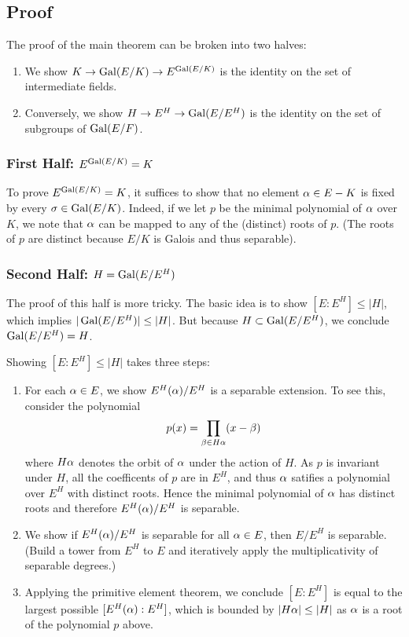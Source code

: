 \subsection{Proof}
The proof of the main theorem can be broken into two halves:
\begin{enumerate}
    \item We show $K \rightarrow \operatorname{Gal}(E/K) \rightarrow E^{\operatorname{Gal}(E/K)}$ is the identity on the set of intermediate fields.
    \item Conversely, we show $H \rightarrow E^H \rightarrow \operatorname{Gal}(E/E^H)$ is the identity on the set of subgroups of $\operatorname{Gal}(E/F)$.
\end{enumerate}

\subsubsection{First Half: $E^{\operatorname{Gal}(E/K)} = K$}
To prove $E^{\operatorname{Gal}(E/K)} = K$, it suffices to show that no element $\alpha \in E-K$ is fixed by every $\sigma \in \operatorname{Gal}(E/K)$. Indeed, if we let $p$ be the minimal polynomial of $\alpha$ over $K$, we note that $\alpha$ can be mapped to any of the (distinct) roots of $p$. (The roots of $p$ are distinct because $E/K$ is Galois and thus separable).

\subsubsection{Second Half: $H = \operatorname{Gal}(E/E^H)$}
The proof of this half is more tricky. The basic idea is to show $[E : E^H] \leq |H|$, which implies $|\operatorname{Gal}(E/E^H)| \leq |H|$. But because $H \subset \operatorname{Gal}(E/E^H)$, we conclude $\operatorname{Gal}(E/E^H) = H$.

Showing $[E : E^H] \leq |H|$ takes three steps:
\begin{enumerate}
    \item For each $\alpha \in E$, we show $E^H(\alpha)/E^H$ is a separable extension. To see this, consider the polynomial
        \[
            p(x) = \prod_{\beta \in H\alpha} (x - \beta)
        \]
        where $H\alpha$ denotes the orbit of $\alpha$ under the action of $H$. As $p$ is invariant under $H$, all the coefficents of $p$ are in $E^H$, and thus $\alpha$ satifies a polynomial over $E^H$ with distinct roots. Hence the minimal polynomial of $\alpha$ has distinct roots and therefore $E^H(\alpha)/E^H$ is separable.
    \item We show if $E^H(\alpha)/E^H$ is separable for all $\alpha \in E$, then $E/E^H$ is separable. (Build a tower from $E^H$ to $E$ and iteratively apply the multiplicativity of separable degrees.)
    \item Applying the primitive element theorem, we conclude $[E : E^H]$ is equal to the largest possible $[E^H(\alpha): E^H]$, which is bounded by $|H\alpha| \leq |H|$ as $\alpha$ is a root of the polynomial $p$ above.
\end{enumerate}

